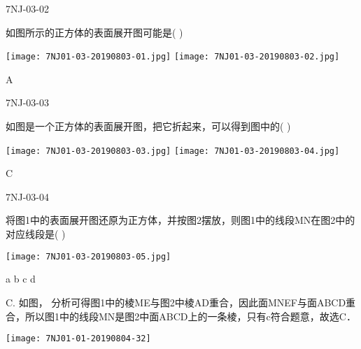 \begin{defproblem}{7NJ-03-02}%
\begin{onlyproblem}%
如图所示的正方体的表面展开图可能是(    ) 
\begin{center}
\texttt{[image: 7NJ01-03-20190803-01.jpg]}
\texttt{[image: 7NJ01-03-20190803-02.jpg]}
\end{center}

\end{onlyproblem}%
\begin{onlysolution}%
\begin{solution}%
A
\end{solution}%
\end{onlysolution}%
\end{defproblem}




\begin{defproblem}{7NJ-03-03}%
\begin{onlyproblem}%
如图是一个正方体的表面展开图，把它折起来，可以得到图中的(    ) 
\begin{center}
\texttt{[image: 7NJ01-03-20190803-03.jpg]}
\texttt{[image: 7NJ01-03-20190803-04.jpg]}
\end{center}


\end{onlyproblem}%
\begin{onlysolution}%
\begin{solution}%
C
\end{solution}%
\end{onlysolution}%
\end{defproblem}




\begin{defproblem}{7NJ-03-04}%
\begin{onlyproblem}%
将图1中的表面展开图还原为正方体，并按图2摆放，则图1中的线段MN在图2中的对应线段是(    ) 
\begin{center}
\texttt{[image: 7NJ01-03-20190803-05.jpg]}
\end{center}

\xx
{a}
{b}
{c}
{d}

\end{onlyproblem}%
\begin{onlysolution}%
\begin{solution}%
C.
如图，   分析可得图1中的棱ME与图2中棱AD重合，因此面MNEF与面ABCD重合，所以图1中的线段MN是图2中面ABCD上的一条棱，只有c符合题意，故选C． 
\begin{center}
\texttt{[image: 7NJ01-01-20190804-32]}
\end{center}
\end{solution}%
\end{onlysolution}%
\end{defproblem}



